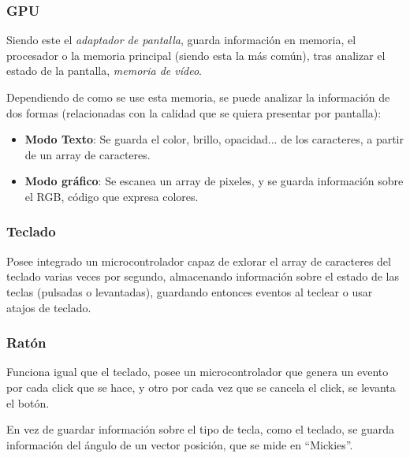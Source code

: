 \subsubsection{GPU}
\noindent Siendo este el \textit{adaptador de pantalla}, guarda información en memoria, el procesador o la memoria principal (siendo esta la más común), tras analizar el estado de la pantalla, \textit{memoria de vídeo}.\par \noindent Dependiendo de como se use esta memoria, se puede analizar la información de dos formas (relacionadas con la calidad que se quiera presentar por pantalla):
\begin{itemize}
        \item \textbf{Modo Texto}: Se guarda el color, brillo, opacidad... de los caracteres, a partir de un array de caracteres.
        \item \textbf{Modo gráfico}: Se escanea un array de pixeles, y se guarda información sobre el RGB, código que expresa colores.
\end{itemize}
\subsubsection{Teclado}
\noindent Posee integrado un microcontrolador capaz de exlorar el array de caracteres del teclado varias veces por segundo, almacenando información sobre el estado de las teclas (pulsadas o levantadas), guardando entonces eventos al teclear o usar atajos de teclado.
\subsubsection{Ratón}
\noindent Funciona igual que el teclado, posee un microcontrolador que genera un evento por cada click que se hace, y otro por cada vez que se cancela el click, se levanta el botón. \par \noindent En vez de guardar información sobre el tipo de tecla, como el teclado, se guarda información del ángulo de un vector posición, que se mide en ``Mickies''.
